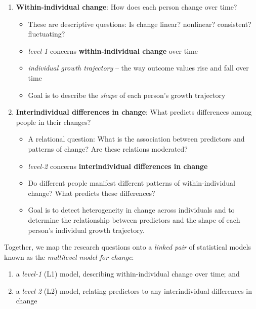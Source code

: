 \documentclass[
  english,
]{book}
\providecommand{\tightlist}{%
  \setlength{\itemsep}{0pt}\setlength{\parskip}{0pt}}
\begin{document}
\begin{enumerate}
\def\labelenumi{\arabic{enumi}.}
\tightlist
\item
  \textbf{Within-individual change}: How does each person change over time?

  \begin{itemize}
  \tightlist
  \item
    These are descriptive questions: Is change linear? nonlinear? consistent? fluctuating?
  \item
    \emph{level-1} concerns \textbf{within-individual change} over time
  \item
    \emph{individual growth trajectory} -- the way outcome values rise and fall over time
  \item
    Goal is to describe the \emph{shape} of each person's growth trajectory
  \end{itemize}
\item
  \textbf{Interindividual differences in change}: What predicts differences among people in their changes?

  \begin{itemize}
  \tightlist
  \item
    A relational question: What is the association between predictors and patterns of change? Are these relations moderated?
  \item
    \emph{level-2} concerns \textbf{interindividual differences in change}
  \item
    Do different people manifest different patterns of within-individual change? What predicts these differences?
  \item
    Goal is to detect heterogeneity in change across individuals and to determine the relationship between predictors and the shape of each person's individual growth trajectory.
  \end{itemize}
\end{enumerate}

Together, we map the research questions onto a \emph{linked pair} of statistical models known as the \emph{multilevel model for change}:

\begin{enumerate}
\def\labelenumi{\arabic{enumi}.}
\tightlist
\item
  a \emph{level-1} (L1) model, describing within-individual change over time; and
\item
  a \emph{level-2} (L2) model, relating predictors to any interindividual differences in change
\end{enumerate}
\end{document}

